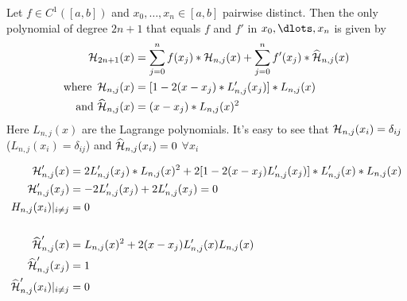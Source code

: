 \begin{theorem}
    Let $f \in C^1([a,b])$ and $x_0, \ldots, x_n \in [a,b]$ pairwise distinct.
    Then the only polynomial of degree $2n+1$ that equals $f$ and $f'$ in $x_0, \dlots, x_n$ is given by
    \begin{align*}
        \operatorname{\mathcal{H}}_{2n+1}(x) &= \sum_{j=0}^{n} f(x_j) * \operatorname{\mathcal{H}}_{n,j}(x) + \sum_{j=0}^{n} f'(x_j) * \widehat{\operatorname{\mathcal{H}}}_{n,j}(x)\\
        \text{where } \operatorname{\mathcal{H}}_{n,j}(x) &= [1-2(x-x_j) * L'_{n,j}(x_j)]*L_{n,j}(x)\\
        \text{and } \widehat{\operatorname{\mathcal{H}}}_{n,j}(x) &= (x-x_j)*L_{n,j}(x)^2
    \end{align*}
    Here $L_{n,j}(x)$ are the Lagrange polynomials.
    It's easy to see that $\operatorname{\mathcal{H}}_{n,j}(x_i) = \delta_{ij}$ ($L_{n,j}(x_i) = \delta_{ij}$)
    and $\widehat{\operatorname{\mathcal{H}}}_{n,j}(x_i) = 0$ $\forall x_i$

    \begin{align*}
        \operatorname{\mathcal{H}}_{n,j}'(x) &= 2 L'_{n,j}(x_j)*L_{n,j}(x)^2 + 2[1-2(x-x_j)L_{n,j}'(x_j)]*L_{n,j}'(x)*L_{n,j}(x)\\
        \operatorname{\mathcal{H}}_{n,j}'(x_j) &= -2L_{n,j}'(x_j)+2L_{n,j}'(x_j) = 0\\
        H_{n,j}(x_i) |_{i \neq j} &= 0\\
        \\
        \widehat{\operatorname{\mathcal{H}}}_{n,j}'(x)&=L_{n,j}(x)^2+2(x-x_j)L_{n,j}'(x)L_{n,j}(x)\\
        \widehat{\operatorname{\mathcal{H}}}_{n,j}'(x_j)&= 1\\
        \widehat{\operatorname{\mathcal{H}}}_{n,j}'(x_i) |_{i \neq j} &= 0
    \end{align*}
\end{theorem}

